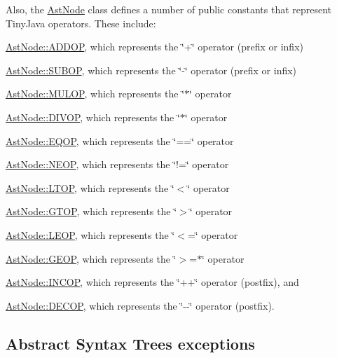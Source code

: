 Also, the \hyperlink{classAstNode}{AstNode} class defines a number of public constants that represent TinyJava operators. These include:
\begin{DoxyItemize}
\item \hyperlink{classAstNode_af908b13b6954116a438f86ce595d5bfe}{AstNode::ADDOP}, which represents the \char`\"{}+\char`\"{} operator (prefix or infix)
\item \hyperlink{classAstNode_a8d62c361a16d84b762172fac68650561}{AstNode::SUBOP}, which represents the \char`\"{}-\/\char`\"{} operator (prefix or infix)
\item \hyperlink{classAstNode_af1564bffc1a770122ea56654f4439531}{AstNode::MULOP}, which represents the \char`\"{}$\ast$\char`\"{} operator
\item \hyperlink{classAstNode_a3972892cd58f1c70c84366804bdfd371}{AstNode::DIVOP}, which represents the \char`\"{}$\ast$\char`\"{} operator
\item \hyperlink{classAstNode_a9cb6a842a496aed85756aa779789ce77}{AstNode::EQOP}, which represents the \char`\"{}==\char`\"{} operator
\item \hyperlink{classAstNode_a3347eacf3e38675c075a7ce1c4cb6e29}{AstNode::NEOP}, which represents the \char`\"{}!=\char`\"{} operator
\item \hyperlink{classAstNode_a1ddf9dbcce4b80d311e7080b8262b65b}{AstNode::LTOP}, which represents the \char`\"{}$<$\char`\"{} operator
\item \hyperlink{classAstNode_a3103a273c9da38b092334c757ee19ace}{AstNode::GTOP}, which represents the \char`\"{}$>$\char`\"{} operator
\item \hyperlink{classAstNode_ac62da8b0313271a74293826f586dd6ea}{AstNode::LEOP}, which represents the \char`\"{}$<$=\char`\"{} operator
\item \hyperlink{classAstNode_aeb92e9f6e1407ff0c945f220b3da9820}{AstNode::GEOP}, which represents the \char`\"{}$>$=$\ast$\char`\"{} operator
\item \hyperlink{classAstNode_abf9092d925819312d2547c414b493c4f}{AstNode::INCOP}, which represents the \char`\"{}++\char`\"{} operator (postfix), and
\item \hyperlink{classAstNode_a0a48e47b23689fb51c059cb48a007adc}{AstNode::DECOP}, which represents the \char`\"{}-\/-\/\char`\"{} operator (postfix).
\end{DoxyItemize}\hypertarget{main_EXCEPTIONS}{}\subsection{Abstract Syntax Trees exceptions}\label{main_EXCEPTIONS}
